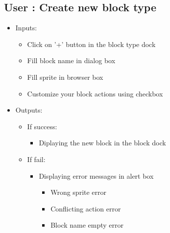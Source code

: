 \subsection{User : Create new block type}
	\begin{itemize}
	
	
		\item Inputs:
			\begin{itemize}
				\item Click on '+' button in the block type dock
				\item Fill block name in dialog box
				\item Fill sprite in browser box
				\item Customize your block actions using checkbox
			\end{itemize}
			\item Outputs:
				\begin{itemize}
					\item If success:					
					\begin{itemize}
						\item Diplaying the new block in the block dock
					\end{itemize}
					\item If fail:
					\begin{itemize}
					\item Displaying error messages in alert box
					\begin{itemize}
						\item Wrong sprite error
						\item Conflicting action error
						\item Block name empty error
					\end{itemize}
					\end{itemize}
				\end{itemize}
	\end{itemize}
	

